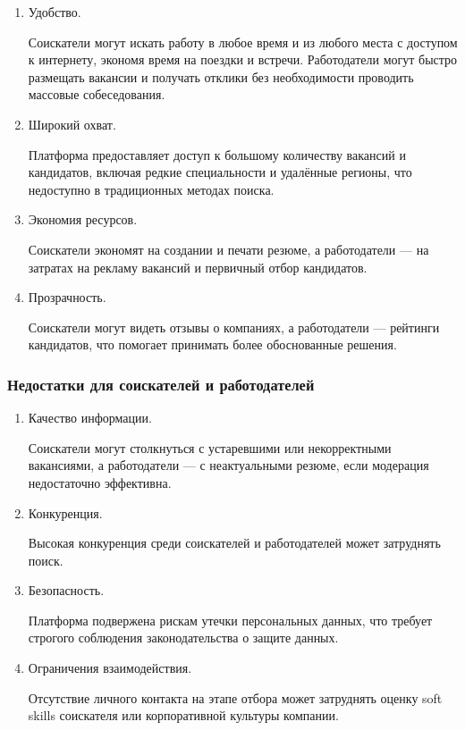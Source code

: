\begin{enumerate}
	\item Удобство.
	
	Соискатели могут искать работу в любое время и из любого места с доступом к интернету, экономя время на поездки и встречи. Работодатели могут быстро размещать вакансии и получать отклики без необходимости проводить массовые собеседования.
	
	\item Широкий охват. 
	
	Платформа предоставляет доступ к большому количеству вакансий и кандидатов, включая редкие специальности и удалённые регионы, что недоступно в традиционных методах поиска.
	
	\item Экономия ресурсов. 
	
	Соискатели экономят на создании и печати резюме, а работодатели — на затратах на рекламу вакансий и первичный отбор кандидатов.
	
	\item Прозрачность. 
	
	Соискатели могут видеть отзывы о компаниях, а работодатели — рейтинги кандидатов, что помогает принимать более обоснованные решения.
\end{enumerate}







\subsubsection{Недостатки для соискателей и работодателей}

\begin{enumerate}
	\item Качество информации.
	
	Соискатели могут столкнуться с устаревшими или некорректными вакансиями, а работодатели — с неактуальными резюме, если модерация недостаточно эффективна.
	
	\item Конкуренция. 
	
	Высокая конкуренция среди соискателей и работодателей может затруднять поиск.
	
	\item Безопасность. 
	
	Платформа подвержена рискам утечки персональных данных, что требует строгого соблюдения законодательства о защите данных.
	
	\item Ограничения взаимодействия. 
	
	Отсутствие личного контакта на этапе отбора может затруднять оценку soft skills соискателя или корпоративной культуры компании.
\end{enumerate}
